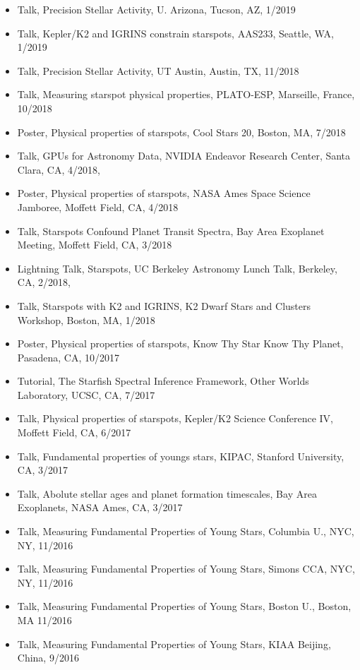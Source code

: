 \documentclass[10pt,letterpaper]{article}
\begin{document}
\begin{itemize}

    \item Talk, Precision Stellar Activity, U. Arizona, Tucson, AZ, 1/2019
    \item Talk, Kepler/K2 and IGRINS constrain starspots, AAS233, Seattle, WA, 1/2019
    \item Talk, Precision Stellar Activity, UT Austin, Austin, TX, 11/2018
    \item Talk, Measuring starspot physical properties, PLATO-ESP, Marseille, France, 10/2018
    \item Poster, Physical properties of starspots, Cool Stars 20, Boston, MA, 7/2018
    \item Talk, GPUs for Astronomy Data, NVIDIA Endeavor Research Center, Santa Clara, CA, 4/2018,
    \item Poster, Physical properties of starspots, NASA Ames Space Science Jamboree, Moffett Field, CA, 4/2018
    \item Talk, Starspots Confound Planet Transit Spectra, Bay Area Exoplanet Meeting, Moffett Field, CA, 3/2018
    \item Lightning Talk, Starspots, UC Berkeley Astronomy Lunch Talk, Berkeley, CA, 2/2018,
    \item Talk, Starspots with K2 and IGRINS, K2 Dwarf Stars and Clusters Workshop, Boston, MA, 1/2018
    \item Poster, Physical properties of starspots, Know Thy Star Know Thy Planet, Pasadena, CA, 10/2017
    \item Tutorial, The Starfish Spectral Inference Framework, Other Worlds Laboratory, UCSC, CA, 7/2017
    \item Talk, Physical properties of starspots, Kepler/K2 Science Conference IV, Moffett Field, CA, 6/2017
    \item Talk, Fundamental properties of youngs stars, KIPAC, Stanford University, CA, 3/2017
    \item Talk, Abolute stellar ages and planet formation timescales, Bay Area Exoplanets, NASA Ames, CA, 3/2017
    \item Talk, Measuring Fundamental Properties of Young Stars, Columbia U., NYC, NY, 11/2016
    \item Talk, Measuring Fundamental Properties of Young Stars, Simons CCA, NYC, NY, 11/2016
    \item Talk, Measuring Fundamental Properties of Young Stars, Boston U., Boston, MA 11/2016
    \item Talk, Measuring Fundamental Properties of Young Stars, KIAA Beijing, China, 9/2016

\end{itemize}
\end{document}
